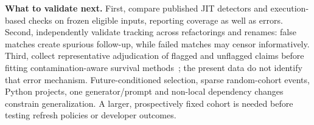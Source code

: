 \textbf{What to validate next.} First, compare published JIT detectors and execution-based checks on frozen eligible inputs, reporting coverage as well as errors. Second, independently validate tracking across refactorings and renames: false matches create spurious follow-up, while failed matches may censor informatively. Third, collect representative adjudication of flagged and unflagged claims before fitting contamination-aware survival methods~\cite{bladt2026contaminated}; the present data do not identify that error mechanism. Future-conditioned selection, sparse random-cohort events, \XNRepos{} Python projects, one generator/prompt and non-local dependency changes constrain generalization. A larger, prospectively fixed cohort is needed before testing refresh policies or developer outcomes.
